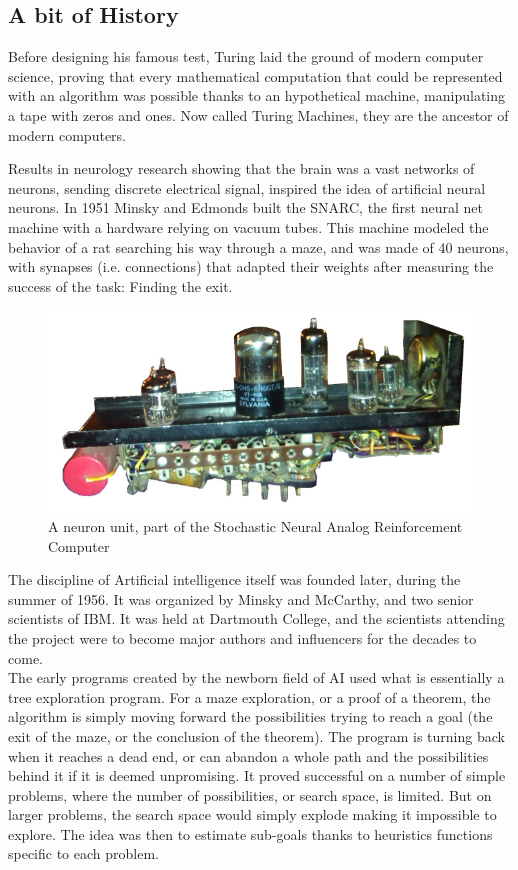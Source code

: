 \documentclass[12pt]{article}
\begin{document}
\subsection{A bit of History}

\smallskip

Before designing his famous test, Turing laid the ground of modern computer
science, proving that every mathematical computation that could be represented
with an algorithm was possible thanks to an hypothetical machine, manipulating
a tape with zeros and ones. Now called Turing Machines, they are the ancestor
of modern computers.\cite{Turing1936}

Results in neurology research showing that the brain was a vast networks of
neurons, sending discrete electrical signal, inspired the idea of artificial
neural neurons. In 1951 Minsky and Edmonds built the SNARC, the first neural net
machine with a hardware relying on vacuum tubes. This machine modeled the
behavior of a  rat searching his way through a maze, and was made of 40 neurons,
with synapses (i.e. connections) that adapted their weights after measuring the
success of the task: Finding the exit.

\begin{figure}[ht]
    \centering
    \includegraphics[width=\textwidth]{SNARC}
    \caption{A neuron unit, part of the Stochastic Neural Analog Reinforcement Computer}
    \label{fig:snarc}
\end{figure}

The discipline of Artificial intelligence itself was founded later, during the
summer of 1956. It was organized by Minsky and McCarthy, and two senior
scientists of IBM. It was held at Dartmouth College, and the scientists
attending the project were to become major authors and influencers for the
decades to come. \cite{DartMouth}\\

The early programs created by the newborn field of AI used what is essentially a
tree exploration program. For a maze exploration, or a proof of a theorem, the
algorithm is simply moving forward the possibilities trying to reach a goal (the
exit of the maze, or the conclusion of the theorem). The program is turning
back when it reaches a dead end, or can abandon a whole path and the
possibilities behind it if it is deemed unpromising. It proved successful on a
number of simple problems, where the number of possibilities, or search space,
is limited. But on larger problems, the search space would simply explode making
it impossible to explore. The idea was then to estimate sub-goals thanks to
heuristics functions specific to each problem.
\end{document}
